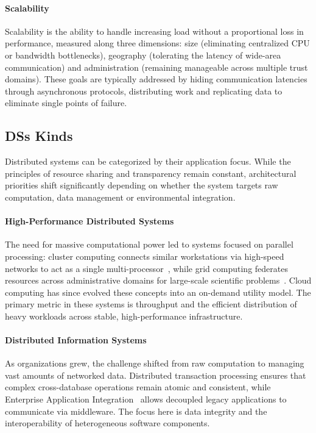 \paragraph{Scalability}
Scalability is the ability to handle increasing load without a proportional loss in performance, measured along three dimensions: size (eliminating centralized CPU or bandwidth bottlenecks), geography (tolerating the latency of wide-area communication) and administration (remaining manageable across multiple trust domains). These goals are typically addressed by hiding communication latencies through asynchronous protocols, distributing work and replicating data to eliminate single points of failure.

\subsection{\aclp{DS} Kinds}

Distributed systems can be categorized by their application focus. While the principles of resource sharing and transparency remain constant, architectural priorities shift significantly depending on whether the system targets raw computation, data management or environmental integration.

\paragraph{High-Performance Distributed Systems}
The need for massive computational power led to systems focused on parallel processing: cluster computing connects similar workstations via high-speed networks to act as a single multi-processor~\cite{Amar_Barak_Shiloh_2004}, while grid computing federates resources across administrative domains for large-scale scientific problems~\cite{Foster_Kesselman_Tuecke_2004}. Cloud computing has since evolved these concepts into an on-demand utility model. The primary metric in these systems is throughput and the efficient distribution of heavy workloads across stable, high-performance infrastructure.

\paragraph{Distributed Information Systems}
As organizations grew, the challenge shifted from raw computation to managing vast amounts of networked data. Distributed transaction processing ensures that complex cross-database operations remain atomic and consistent, while Enterprise Application Integration~\cite{Enterprise} allows decoupled legacy applications to communicate via middleware. The focus here is data integrity and the interoperability of heterogeneous software components.

